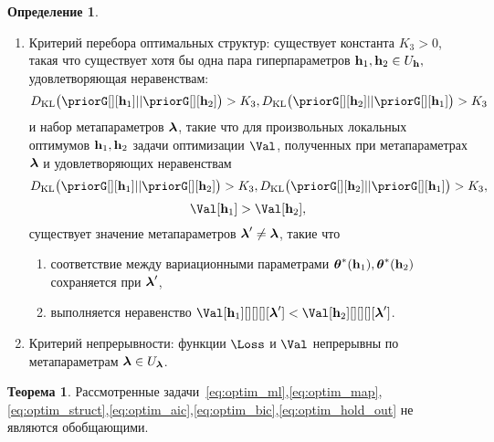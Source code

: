 \documentclass[11pt, a5paper]{dissert}
\theoremstyle{definition}
\newtheorem{theorem}{Теорема}
\newtheorem{defin}{Определение}
\begin{document}
{\begin{defin}
\begin{enumerate}
\item Критерий перебора оптимальных структур: существует константа $K_3>0$, такая что существует хотя бы одна пара гиперпараметров $\mathbf{h}_1, \mathbf{h}_2 \in U_{\mathbf{h}},$ удовлетворяющая неравенствам:
$$\KL{\priorG[][\h_1]}{\priorG[][\h_2]} > K_3,\KL{\priorG[][\h_2]}{\priorG[][\h_1]}>K_3$$ и набор метапараметров $\boldsymbol{\lambda}$, такие что для произвольных локальных оптимумов  $\mathbf{h}_1,\mathbf{h}_2$ задачи оптимизации $\Val$, полученных при метапараметрах $\boldsymbol{\lambda}$ и удовлетворяющих неравенствам $$\KL{\priorG[][\h_1]}{\priorG[][\h_2]} > K_3, \KL{\priorG[][\h_2]}{\priorG[][\h_1]}>K_3,$$$$\Val[\h_1] > \Val[\h_2],$$  существует значение метапараметров $\boldsymbol{\lambda}' \neq \boldsymbol{\lambda}$, такие что
\begin{enumerate}
\item соответствие между вариационными параметрами $\boldsymbol{\theta}^{*}(\mathbf{h}_1),\boldsymbol{\theta}^{*}(\mathbf{h}_2)$ сохраняется при  $\boldsymbol{\lambda}'$,
\item выполняется неравенство $\Val[\h_1][][][][\lam'] < \Val[\h_2][][][][\lam']$.
\end{enumerate}


\item Критерий непрерывности: функции $\Loss$ и $\Val$ непрерывны по метапараметрам $\boldsymbol{\lambda} \in U_{\boldsymbol{\lambda}}$.
\end{enumerate}
\end{defin}

\begin{theorem}Рассмотренные задачи~\eqref{eq:optim_ml},\eqref{eq:optim_map},\eqref{eq:optim_struct},\eqref{eq:optim_aic},\eqref{eq:optim_bic},\eqref{eq:optim_hold_out} не являются обобщающими.
\end{theorem}

}
\end{document}
